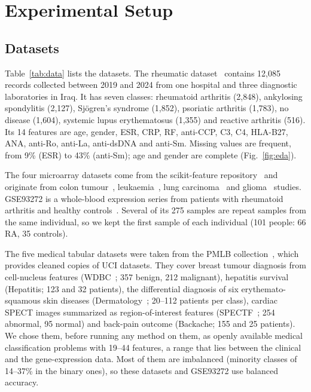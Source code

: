 \documentclass[journal]{IEEEtran}
\begin{document}
\section{Experimental Setup}\label{sec:setup}

\subsection{Datasets}
Table~\ref{tab:data} lists the datasets. The rheumatic dataset~\cite{mahdi2025data} contains 12,085 records collected between 2019 and 2024 from one hospital and three diagnostic laboratories in Iraq. It has seven classes: rheumatoid arthritis (2,848), ankylosing spondylitis (2,127), Sj\"ogren's syndrome (1,852), psoriatic arthritis (1,783), no disease (1,604), systemic lupus erythematosus (1,355) and reactive arthritis (516). Its 14 features are age, gender, ESR, CRP, RF, anti-CCP, C3, C4, HLA-B27, ANA, anti-Ro, anti-La, anti-dsDNA and anti-Sm. Missing values are frequent, from 9\% (ESR) to 43\% (anti-Sm); age and gender are complete (Fig.~\ref{fig:eda}).

The four microarray datasets come from the scikit-feature repository~\cite{li2017fs} and originate from colon tumour~\cite{alon1999}, leukaemia~\cite{golub1999}, lung carcinoma~\cite{bhattacharjee2001} and glioma~\cite{nutt2003} studies. GSE93272 is a whole-blood expression series from patients with rheumatoid arthritis and healthy controls~\cite{tasaki2018}. Several of its 275 samples are repeat samples from the same individual, so we kept the first sample of each individual (101 people: 66 RA, 35 controls).

The five medical tabular datasets were taken from the PMLB collection~\cite{olson2017pmlb}, which provides cleaned copies of UCI datasets. They cover breast tumour diagnosis from cell-nucleus features (WDBC~\cite{street1993}; 357 benign, 212 malignant), hepatitis survival (Hepatitis; 123 and 32 patients), the differential diagnosis of six erythemato-squamous skin diseases (Dermatology~\cite{guvenir1998}; 20--112 patients per class), cardiac SPECT images summarized as region-of-interest features (SPECTF~\cite{kurgan2001}; 254 abnormal, 95 normal) and back-pain outcome (Backache; 155 and 25 patients). We chose them, before running any method on them, as openly available medical classification problems with 19--44 features, a range that lies between the clinical and the gene-expression data. Most of them are imbalanced (minority classes of 14--37\% in the binary ones), so these datasets and GSE93272 use balanced accuracy.
\end{document}
